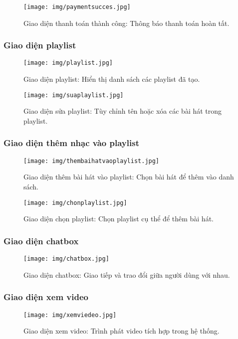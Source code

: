 \documentclass[a4paper,12pt]{article}
\begin{document}
\begin{figure}[H]
  \centering
  \texttt{[image: img/paymentsucces.jpg]}
  \caption{Giao diện thanh toán thành công: Thông báo thanh toán hoàn tất.}
  \label{fig:paymentsucces}
\end{figure}

\subsubsection{Giao diện playlist}
\begin{figure}[H]
  \centering
  \texttt{[image: img/playlist.jpg]}
  \caption{Giao diện playlist: Hiển thị danh sách các playlist đã tạo.}
  \label{fig:playlist}
\end{figure}

\begin{figure}[H]
  \centering
  \texttt{[image: img/suaplaylist.jpg]}
  \caption{Giao diện sửa playlist: Tùy chỉnh tên hoặc xóa các bài hát trong playlist.}
  \label{fig:suaplaylist}
\end{figure}

\subsubsection{Giao diện thêm nhạc vào playlist}
\begin{figure}[H]
  \centering
  \texttt{[image: img/thembaihatvaoplaylist.jpg]}
  \caption{Giao diện thêm bài hát vào playlist: Chọn bài hát để thêm vào danh sách.}
  \label{fig:thembaihatvaoplaylis}
\end{figure}

\begin{figure}[H]
  \centering
  \texttt{[image: img/chonplaylist.jpg]}
  \caption{Giao diện chọn playlist: Chọn playlist cụ thể để thêm bài hát.}
  \label{fig:chonplaylist}
\end{figure}

\subsubsection{Giao diện chatbox}
\begin{figure}[H]
  \centering
  \texttt{[image: img/chatbox.jpg]}
  \caption{Giao diện chatbox: Giao tiếp và trao đổi giữa người dùng với nhau.}
  \label{fig:chatbox}
\end{figure}

\subsubsection{Giao diện xem video}
\begin{figure}[H]
  \centering
  \texttt{[image: img/xemviedeo.jpg]}
  \caption{Giao diện xem video: Trình phát video tích hợp trong hệ thống.}
  \label{fig:xemvideo}
\end{figure}
\end{document}
